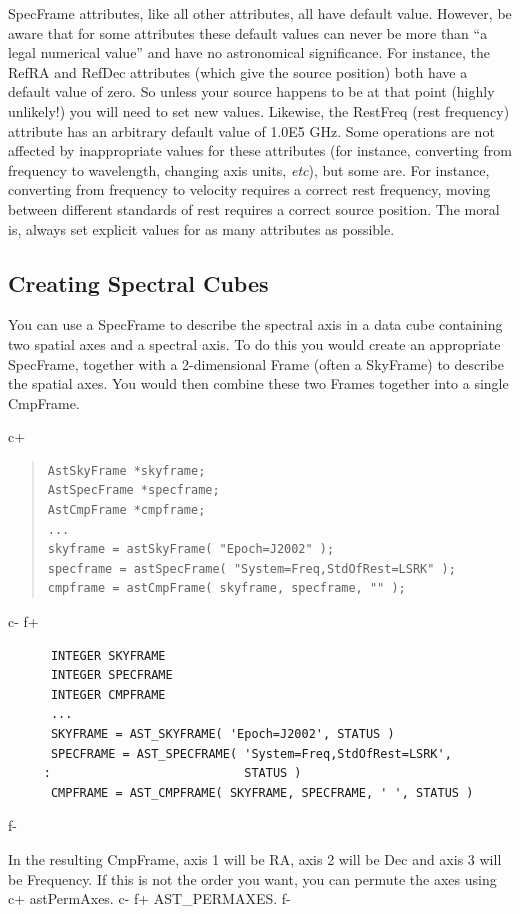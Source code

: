 \documentclass[twoside,11pt]{article}
\begin{document}
SpecFrame attributes, like all other attributes, all have default
value. However, be aware that for some attributes these default values
can never be more than ``a legal numerical value'' and have no
astronomical significance. For instance, the RefRA and RefDec attributes
(which give the source position) both have a default value of zero. So
unless your source happens to be at that point (highly unlikely!) you will
need to set new values. Likewise, the RestFreq (rest frequency) attribute
has an arbitrary default value of 1.0E5 GHz. Some operations are not
affected by inappropriate values for these attributes (for instance,
converting from frequency to wavelength, changing axis units, \emph{etc}),
but some are. For instance, converting from frequency to velocity
requires a correct rest frequency, moving between different standards of
rest requires a correct source position. The moral is, always set explicit
values for as many attributes as possible.

\subsection{\label{ss:creatingspectralcubes}Creating Spectral Cubes}
You can use a SpecFrame to describe the spectral axis in a data cube
containing two spatial axes and a spectral axis. To do this you would
create an appropriate SpecFrame, together with a 2-dimensional Frame 
(often a SkyFrame) to describe the spatial axes. You would then combine
these two Frames together into a single CmpFrame.

c+
\begin{quote}
\small
\begin{verbatim}
AstSkyFrame *skyframe;
AstSpecFrame *specframe;
AstCmpFrame *cmpframe;
...
skyframe = astSkyFrame( "Epoch=J2002" );
specframe = astSpecFrame( "System=Freq,StdOfRest=LSRK" );
cmpframe = astCmpFrame( skyframe, specframe, "" );
\end{verbatim}
\normalsize
\end{quote}
c-
f+
\small
\begin{verbatim}
      INTEGER SKYFRAME
      INTEGER SPECFRAME
      INTEGER CMPFRAME
      ...
      SKYFRAME = AST_SKYFRAME( 'Epoch=J2002', STATUS )
      SPECFRAME = AST_SPECFRAME( 'System=Freq,StdOfRest=LSRK',
     :                           STATUS )
      CMPFRAME = AST_CMPFRAME( SKYFRAME, SPECFRAME, ' ', STATUS )
\end{verbatim}
\normalsize
f-

In the resulting CmpFrame, axis 1 will be RA, axis 2 will be Dec and axis
3 will be Frequency. If this is not the order you want, you can permute
the axes using 
c+
astPermAxes.
c-
f+
AST\_PERMAXES.
f-
\end{document}
